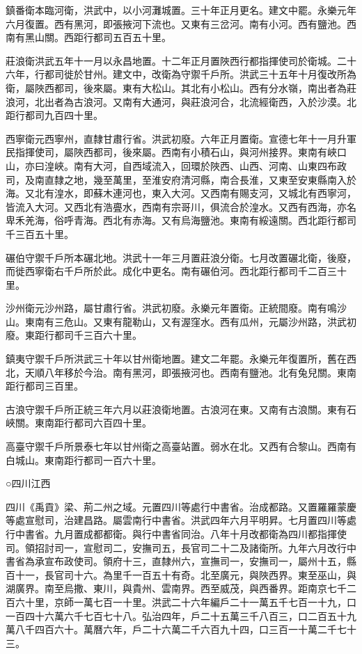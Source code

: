 鎮番衛本臨河衛，洪武中，以小河灘城置。三十年正月更名。建文中罷。永樂元年六月復置。西有黑河，即張掖河下流也。又東有三岔河。南有小河。西有鹽池。西南有黑山關。西距行都司五百五十里。

莊浪衛洪武五年十一月以永昌地置。十二年正月置陜西行都指揮使司於衛城。二十六年，行都司徙於甘州。建文中，改衛為守禦千戶所。洪武三十五年十月復改所為衛，屬陜西都司，後來屬。東有大松山。其北有小松山。西有分水嶺，南出者為莊浪河，北出者為古浪河。又南有大通河，與莊浪河合，北流經衛西，入於沙漠。北距行都司九百四十里。

西寧衛元西寧州，直隸甘肅行省。洪武初廢。六年正月置衛。宣德七年十一月升軍民指揮使司，屬陜西都司，後來屬。西南有小積石山，與河州接界。東南有峽口山，亦曰湟峽。南有大河，自西域流入，回環於陜西、山西、河南、山東四布政司，及南直隸之地，幾至萬里，至淮安府清河縣，南合長淮，又東至安東縣南入於海。又北有湟水，即蘇木連河也，東入大河。又西南有賜支河，又城北有西寧河，皆流入大河。又西北有浩亹水，西南有宗哥川，俱流合於湟水。又西有西海，亦名卑禾羌海，俗呼青海。西北有赤海。又有烏海鹽池。東南有綏遠關。西北距行都司千三百五十里。

碾伯守禦千戶所本碾北地。洪武十一年三月置莊浪分衛。七月改置碾北衛，後廢，而徙西寧衛右千戶所於此。成化中更名。南有碾伯河。西北距行都司千二百三十里。

沙州衛元沙州路，屬甘肅行省。洪武初廢。永樂元年置衛。正統間廢。南有鳴沙山。東南有三危山。又東有龍勒山，又有渥窪水。西有瓜州，元屬沙州路，洪武初廢。東距行都司千三百六十里。

鎮夷守禦千戶所洪武三十年以甘州衛地置。建文二年罷。永樂元年復置所，舊在西北，天順八年移於今治。南有黑河，即張掖河也。西南有鹽池。北有兔兒關。東南距行都司三百里。

古浪守禦千戶所正統三年六月以莊浪衛地置。古浪河在東。又南有古浪關。東有石峽關。東南距行都司六百四十里。

高臺守禦千戶所景泰七年以甘州衛之高臺站置。弱水在北。又西有合黎山。西南有白城山。東南距行都司一百六十里。

○四川江西

四川《禹貢》梁、荊二州之域。元置四川等處行中書省。治成都路。又置羅羅蒙慶等處宣慰司，治建昌路。屬雲南行中書省。洪武四年六月平明昇。七月置四川等處行中書省。九月置成都都衛。與行中書省同治。八年十月改都衛為四川都指揮使司。領招討司一，宣慰司二，安撫司五，長官司二十二及諸衛所。九年六月改行中書省為承宣布政使司。領府十三，直隸州六，宣撫司一，安撫司一，屬州十五，縣百十一，長官司十六。為里千一百五十有奇。北至廣元，與陜西界。東至巫山，與湖廣界。南至烏撒、東川，與貴州、雲南界。西至威茂，與西番界。距南京七千二百六十里，京師一萬七百一十里。洪武二十六年編戶二十一萬五千七百一十九，口一百四十六萬六千七百七十八。弘治四年，戶二十五萬三千八百三，口二百五十九萬八千四百六十。萬曆六年，戶二十六萬二千六百九十四，口三百一十萬二千七十三。

